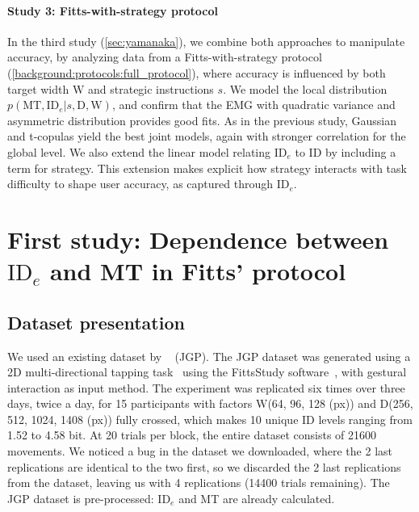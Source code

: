 \documentclass[acmlarge, manuscript,review]{acmart}
\newcommand{\mt}{\ensuremath{{\text{MT}}}\xspace}
\newcommand{\ide}{\ensuremath{{\text{ID}_e}}\xspace}
\newcommand{\D}{\ensuremath{{\text{D}}}\xspace}
\newcommand{\W}{\ensuremath{{\text{W}}}\xspace}
\begin{document}
\paragraph*{Study 3: Fitts-with-strategy protocol} 
In the third study (\autoref{sec:yamanaka}), we combine both approaches to manipulate accuracy, by analyzing data from a Fitts-with-strategy protocol (\autoref{background:protocols:full_protocol}), where accuracy is influenced by both target width \W and strategic instructions $s$. 
We model the local distribution $p(\mt, \ide | s, \D, \W)$, and confirm that the EMG with quadratic variance and asymmetric distribution provides good fits. 
As in the previous study, Gaussian and t-copulas yield the best joint models, again with stronger correlation for the global level. 
We also extend the linear model relating \ide to ID by including a term for strategy. This extension makes explicit how strategy interacts with task difficulty to shape user accuracy, as captured through \ide.



\section{First study: Dependence between \ide and MT in Fitts' protocol\label{sec:jgp}}

\subsection{Dataset presentation}
We used an existing dataset by \citeauthor{jude2016}~\cite{jude2016} (JGP). The JGP dataset was generated using a 2D multi-directional tapping task~\cite{soukoreff2004} using the FittsStudy software~\cite{wobbrock2011}, with gestural interaction as input method. The experiment was replicated six times over three days, twice a day, for 15 participants with factors \W (64, 96, 128 (px)) and \D (256, 512, 1024, 1408 (px)) fully crossed, which makes 10 unique ID levels ranging from 1.52 to 4.58 bit. At 20 trials per block, the entire dataset consists of 21600 movements.
We noticed a bug in the dataset we downloaded, where the 2 last replications are identical to the two first, so we discarded the 2 last replications from the dataset, leaving us with 4 replications (14400 trials remaining). The JGP dataset is pre-processed: \ide and MT are already calculated. 
\end{document}
